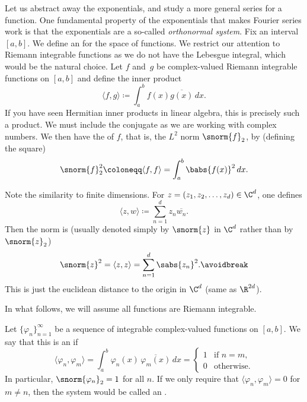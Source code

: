 Let us abstract away the exponentials, and
study a more general series for a function.
One fundamental property of the exponentials that makes Fourier series work
is that the exponentials are a so-called \emph{orthonormal system}.
Fix an interval $[a,b]$.  We define an
\emph{} for the space of functions.  We restrict our attention
to Riemann integrable functions as we do not have the Lebesgue
integral, which
would be the natural choice.  Let $f$ and~$g$ be complex-valued 
Riemann integrable functions on $[a,b]$ and define the inner product
\begin{equation*}
\langle f , g \rangle \coloneqq
\int_a^b f(x) \overline{g(x)} \, dx .
\end{equation*}
If you have seen Hermitian inner products in linear algebra, this
is precisely such a product.  We must include the conjugate as we are
working with complex numbers.  We then have the  of $f$, that
is, the $L^2$ norm $\snorm{f}_2$, by (defining the square)
\begin{equation*}
\snorm{f}_2^2 \coloneqq
\langle f , f \rangle =
\int_a^b \babs{f(x)}^2 \, dx .
\end{equation*}

\begin{remark}
Note the similarity to finite dimensions.
For $z = (z_1,z_2,\ldots,z_d) \in \C^d$, one defines
\begin{equation*}
\langle z , w \rangle \coloneqq
\sum_{n=1}^d z_n \overline{w_n} .
\end{equation*}
Then the norm is (usually denoted simply by $\snorm{z}$ in $\C^d$
rather than by $\snorm{z}_2$)
\begin{equation*}
\snorm{z}^2 = 
\langle z , z \rangle =
\sum_{n=1}^d \sabs{z_n}^2 .
\avoidbreak
\end{equation*}
This is just the euclidean distance to the origin in $\C^d$ (same as
$\R^{2d}$).
\end{remark}

In what follows, we will
assume all functions are Riemann integrable.

\begin{defn}
Let $\{ \varphi_n \}_{n=1}^\infty$ be a sequence of integrable complex-valued
functions on $[a,b]$.  We say that this is an
\emph{} if
\begin{equation*}
\langle \varphi_n , \varphi_m \rangle
=
\int_a^b \varphi_n(x) \, \overline{\varphi_m(x)} \, dx
= 
\begin{cases}
1 & \text{if } n=m, \\
0 & \text{otherwise.}
\end{cases}
\end{equation*}
In particular, $\snorm{\varphi_n}_2 = 1$ for all $n$.  If we
only require that 
$\langle \varphi_n , \varphi_m \rangle = 0$ for $m\not= n$, then
the system would be called an \emph{}.
\end{defn}

